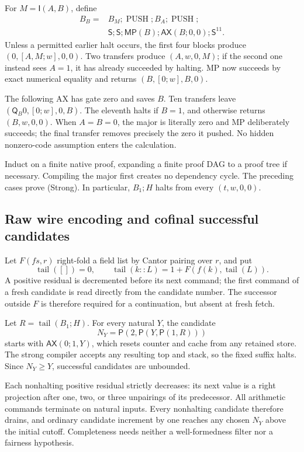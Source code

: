 \documentclass[11pt]{article}
\newcommand{\pair}{\mathsf P}
\newcommand{\imp}{\mathsf I}
\newcommand{\quant}{\mathsf Q}
\newcommand{\AX}{\mathsf{AX}}
\newcommand{\MP}{\mathsf{MP}}
\newcommand{\Tr}{\mathsf S}
\begin{document}
For $M=\imp(A,B)$, define
\[
\begin{split}
 B_B={}&B_M;\operatorname{PUSH};B_A;\operatorname{PUSH};\\
       &\Tr;\Tr;\MP(B);\AX(B;0,0);\Tr^{11}.
\end{split}
\]
Unless a permitted earlier halt occurs, the first four blocks
produce $(0,[A,M;w],0,0)$. Two transfers produce $(A,w,0,M)$;
if the second one instead sees $A=1$, it has already succeeded
by halting. MP now succeeds by exact numerical equality and
returns $(B,[0;w],B,0)$.

The following AX has gate zero and saves $B$. Ten transfers
leave $(\quant_B0,[0;w],0,B)$. The eleventh halts if $B=1$,
and otherwise returns $(B,w,0,0)$. When $A=B=0$, the major
is literally zero and MP deliberately succeeds; the final
transfer removes precisely the zero it pushed. No hidden
nonzero-code assumption enters the calculation.

Induct on a finite native proof, expanding a finite proof DAG
to a proof tree if necessary. Compiling the major first creates
no dependency cycle. The preceding cases prove (Strong).
In particular, $B_1;H$ halts from every $(t,w,0,0)$.

\subsection{Raw wire encoding and cofinal successful candidates}

Let $F(fs,r)$ right-fold a field list by Cantor pairing over
$r$, and put
\[
 \operatorname{tail}([])=0,\qquad
 \operatorname{tail}(k::L)=1+F(f(k),\operatorname{tail}(L)).
\]
A positive residual is decremented before its next command;
the first command of a fresh candidate is read directly from
the candidate number. The successor outside $F$ is therefore
required for a continuation, but absent at fresh fetch.

Let $R=\operatorname{tail}(B_1;H)$. For every natural $Y$, the
candidate
\begin{equation}
                  N_Y=\pair(2,\pair(Y,\pair(1,R)))
 \label{eq:cofinal}
\end{equation}
starts with $\AX(0;1,Y)$, which resets counter and cache from
any retained store. The strong compiler accepts any resulting
top and stack, so the fixed suffix halts. Since $N_Y\ge Y$,
successful candidates are unbounded.

Each nonhalting positive residual strictly decreases: its next
value is a right projection after one, two, or three unpairings
of its predecessor. All arithmetic commands terminate on
natural inputs. Every nonhalting candidate therefore drains,
and ordinary candidate increment by one reaches any chosen
$N_Y$ above the initial cutoff. Completeness needs neither a
well-formedness filter nor a fairness hypothesis.
\end{document}
